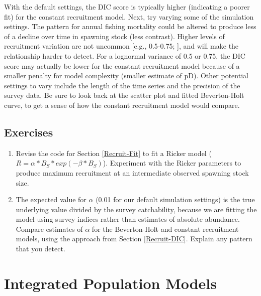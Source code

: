 \documentclass[
]{krantz}
\begin{document}
With the default settings, the DIC score is typically higher (indicating a poorer fit) for the constant recruitment model. Next, try varying some of the simulation settings. The pattern for annual fishing mortality could be altered to produce less of a decline over time in spawning stock (less contrast). Higher levels of recruitment variation are not uncommon {[}e.g., 0.5-0.75; \citet{hightower.grossman_1985}{]}, and will make the relationship harder to detect. For a lognormal variance of 0.5 or 0.75, the DIC score may actually be lower for the constant recruitment model because of a smaller penalty for model complexity (smaller estimate of pD). Other potential settings to vary include the length of the time series and the precision of the survey data. Be sure to look back at the scatter plot and fitted Beverton-Holt curve, to get a sense of how the constant recruitment model would compare.

\hypertarget{exercises-7}{%
\section{Exercises}\label{exercises-7}}

\begin{enumerate}
\def\labelenumi{\arabic{enumi}.}
\item
  Revise the code for Section \ref{Recruit-Fit} to fit a Ricker model (\(R=\alpha*B_S*exp(-\beta*B_S)\)). Experiment with the Ricker parameters to produce maximum recruitment at an intermediate observed spawning stock size.
\item
  The expected value for \(\alpha\) (0.01 for our default simulation settings) is the true underlying value divided by the survey catchability, because we are fitting the model using survey indices rather than estimates of absolute abundance. Compare estimates of \(\alpha\) for the Beverton-Holt and constant recruitment models, using the approach from Section \ref{Recruit-DIC}. Explain any pattern that you detect.
\end{enumerate}

\hypertarget{PopModels}{%
\chapter{Integrated Population Models}\label{PopModels}}
\end{document}
